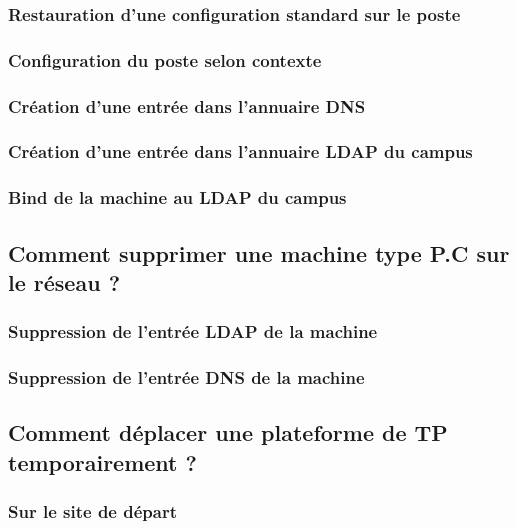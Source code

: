 \documentclass[a4paper]{article}
\begin{document}
\subsubsection{Restauration d'une configuration standard sur le poste}

\subsubsection{Configuration du poste selon contexte}

\subsubsection{Création d'une entrée dans l'annuaire DNS}

\subsubsection{Création d'une entrée dans l'annuaire LDAP du campus}

\subsubsection{Bind de la machine au LDAP du campus}

\subsection{Comment supprimer une machine type P.C sur le réseau ?}

\subsubsection{Suppression de l'entrée LDAP de la machine}

\subsubsection{Suppression de l'entrée DNS de la machine}

\subsection{Comment déplacer une plateforme de TP temporairement ?}

\subsubsection{Sur le site de départ}
\end{document}

